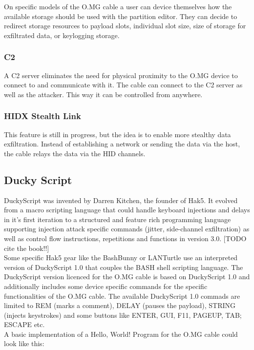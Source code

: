 On specific models of the O.MG cable a user can device themselves how the available storage should be used with the partition editor. They can decide to redirect storage resources to payload slots, individual slot size, size of storage for exfiltrated data, or keylogging storage. 

\subsubsection{C2}
A C2 server eliminates the need for physical proximity to the O.MG device to connect to and communicate with it. The cable can connect to the C2 server as well as the attacker. This way it can be controlled from anywhere. 

\subsubsection{HIDX Stealth Link}
This feature is still in progress, but the idea is to enable more stealthy data exfiltration. Instead of establishing a network or sending the data via the host, the cable relays the data via the HID channels.  


\subsection{Ducky Script} \label{DuckyScript}

DuckyScript was invented by Darren Kitchen, the founder of Hak5. It evolved from a macro scripting language that could handle keyboard injections and delays in it's first iteration to a structured and feature rich programming language supporting injection attack specific commands (jitter, side-channel exfiltration) as well as control flow instructions, repetitions and functions in version 3.0. \cite{the book} [TODO cite the book!!] \\
Some specific Hak5 gear like the BashBunny or LANTurtle use an interpreted version of DuckyScript 1.0 that couples the BASH shell scripting language. \cite{Hak5Usbrubberduckypayloads2024} The DuckyScript version licenced for the O.MG cable is based on DuckyScript 1.0 and additionally includes some device specific commands for the specific functionalities of the O.MG cable. The available DuckyScript 1.0 commads are limited to REM (marks a comment), DELAY (pauses the payload), STRING (injects keystrokes) and some buttons like ENTER, GUI, F11, PAGEUP, TAB; ESCAPE etc. \\
A basic implementation of a Hello, World! Program for the O.MG cable could look like this:

